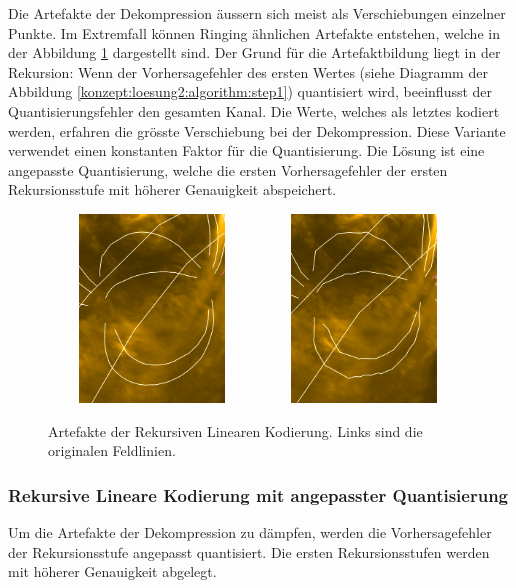 Die Artefakte der Dekompression äussern sich meist als Verschiebungen einzelner Punkte. Im Extremfall können Ringing ähnlichen Artefakte entstehen, welche in der Abbildung \ref{resultate:loesung2:adaptive:median:artefakte} dargestellt sind. Der Grund für die Artefaktbildung liegt in der Rekursion: Wenn der Vorhersagefehler des ersten Wertes (siehe Diagramm der Abbildung \ref{konzept:loesung2:algorithm:step1}) quantisiert wird, beeinflusst der Quantisierungsfehler den gesamten Kanal. Die Werte, welches als letztes kodiert werden, erfahren die grösste Verschiebung bei der Dekompression. Diese Variante verwendet einen konstanten Faktor für die Quantisierung. Die Lösung ist eine angepasste Quantisierung, welche die ersten Vorhersagefehler der ersten Rekursionsstufe mit höherer Genauigkeit abspeichert.

\begin{figure}[!htbp]
	\center
		\includegraphics[width=0.49\textwidth,height=5cm,keepaspectratio]{./pictures/resultate/loesung2/variante3/no_artifacts.png}
	\includegraphics[width=0.49\textwidth,height=5cm,keepaspectratio]{./pictures/resultate/loesung2/variante3/artifacts_8.png}
	\caption{Artefakte der Rekursiven Linearen Kodierung. Links sind die originalen Feldlinien.}
	\label{resultate:loesung2:adaptive:median:artefakte}
\end{figure}

\subsubsection{Rekursive Lineare Kodierung mit angepasster Quantisierung}
Um die Artefakte der Dekompression zu dämpfen, werden die Vorhersagefehler der Rekursionsstufe angepasst quantisiert. Die ersten Rekursionsstufen werden mit höherer Genauigkeit abgelegt.

